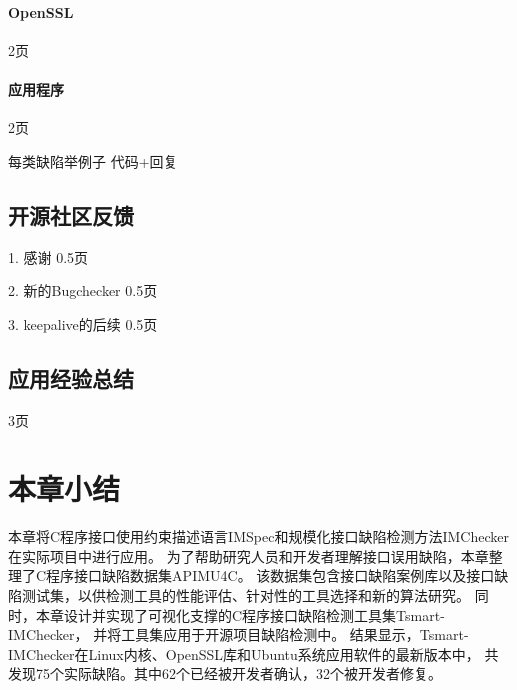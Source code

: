 \paragraph{OpenSSL}
2页

\paragraph{应用程序}
2页

每类缺陷举例子
代码+回复


\subsection{开源社区反馈}
1. 感谢
0.5页

2. 新的Bugchecker
0.5页

3. keepalive的后续
0.5页

\subsection{应用经验总结}

3页

\section{本章小结}
\label{sec:4.5}
本章将C程序接口使用约束描述语言IMSpec和规模化接口缺陷检测方法IMChecker在实际项目中进行应用。
为了帮助研究人员和开发者理解接口误用缺陷，本章整理了C程序接口缺陷数据集APIMU4C。
该数据集包含接口缺陷案例库以及接口缺陷测试集，以供检测工具的性能评估、针对性的工具选择和新的算法研究。
同时，本章设计并实现了可视化支撑的C程序接口缺陷检测工具集Tsmart-IMChecker，
并将工具集应用于开源项目缺陷检测中。
结果显示，Tsmart-IMChecker在Linux内核、OpenSSL库和Ubuntu系统应用软件的最新版本中，
共发现75个实际缺陷。其中62个已经被开发者确认，32个被开发者修复。